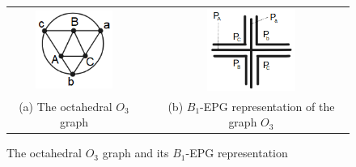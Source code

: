 \begin{figure}[h]
  \centering
  
  \begin{tabular}{@{}c@{} p{1.5cm} @{}c@{} }
   \centering \includegraphics[width=2.5cm]{./img/octaedro.png} & &\includegraphics[width=2.9cm]{./img/representacaoOctaedro.png}  \\[\abovecaptionskip]
    \footnotesize \centering (a) The octahedral $O_3$ graph  & &  \footnotesize(b) $B_1$-EPG representation of the graph $O_3$
  \end{tabular}

 \caption{The octahedral $O_3$ graph and its  $B_1$-EPG representation}\label{fig:octaedro}
\end{figure}